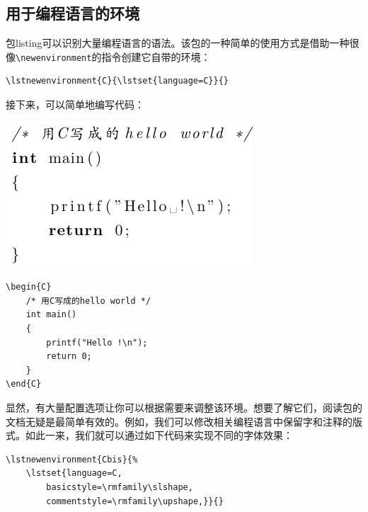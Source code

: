 \subsection{用于编程语言的环境}

包\textsf{listing}可以识别大量编程语言的语法。该包的一种简单的使用方式是借助一种很像\verb|\newenvironment|的指令创建它自带的环境：

\begin{dmd}
\begin{verbatim}
\lstnewenvironment{C}{\lstset{language=C}}{}\end{verbatim}
\end{dmd}

接下来，可以简单地编写代码：


\begin{codelist}[10.7]{
\includegraphics{texs/chelloworld1}
}
\begin{verbatim}
\begin{C}
    /* 用C写成的hello world */
    int main()
    {
        printf("Hello !\n");
        return 0;
    }
\end{C}\end{verbatim}
\end{codelist}

显然，有大量配置选项让你可以根据需要来调整该环境。想要了解它们，阅读包的文档无疑是最简单有效的。例如，我们可以修改相关编程语言中保留字和注释的版式。如此一来，我们就可以通过如下代码来实现不同的字体效果：

\begin{dmd}
\begin{verbatim}
\lstnewenvironment{Cbis}{% 
    \lstset{language=C,
        basicstyle=\rmfamily\slshape,
        commentstyle=\rmfamily\upshape,}}{}\end{verbatim}
\end{dmd}

